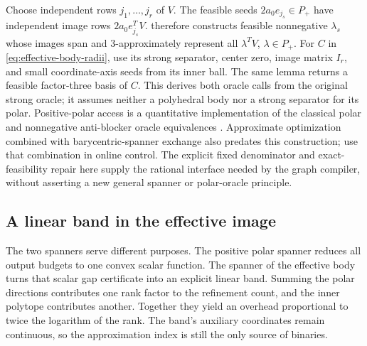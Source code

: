 Choose independent rows $j_1,\ldots,j_r$ of $V$.
The feasible seeds $2a_0e_{j_s}\in P_+$ have independent image rows
$2a_0e_{j_s}^TV$.  therefore constructs
feasible nonnegative $\lambda_s$ whose images span and
$3$-approximately represent all $\lambda^TV$, $\lambda\in P_+$.
For $C$ in \eqref{eq:effective-body-radii}, use its strong separator,
center zero, image matrix $I_r$, and small coordinate-axis seeds from
its inner ball. The same lemma returns a feasible factor-three basis
of $C$. This derives both oracle calls from the original strong oracle;
it assumes neither a polyhedral body nor a strong separator for its polar.
Positive-polar access is a quantitative implementation of the classical
polar and nonnegative anti-blocker oracle equivalences
\citep[Corollaries (3.4)--(3.5)]{gls1981}. Approximate optimization
combined with barycentric-spanner exchange also predates this construction;
\citet[Section 3.3]{plevrakis2020} use that combination in online control.
The explicit fixed denominator and exact-feasibility repair here supply
the rational interface needed by the graph compiler, without asserting
a new general spanner or polar-oracle principle.

\subsection{A linear band in the effective image}

The two spanners serve different purposes. The positive polar spanner
reduces all output budgets to one convex scalar function. The spanner of
the effective body turns that scalar gap certificate into an explicit
linear band. Summing the polar directions contributes one rank factor to
the refinement count, and the inner polytope contributes another. Together
they yield an overhead proportional to twice the logarithm of the rank.
The band's auxiliary coordinates remain
continuous, so the approximation index is still the only source of binaries.

